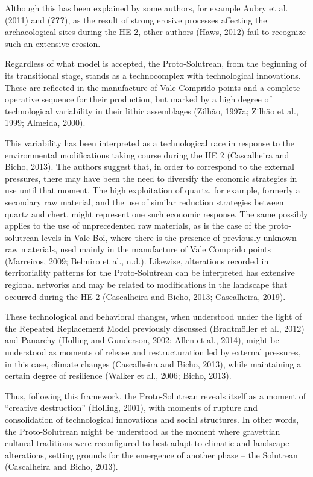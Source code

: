 \documentclass[12pt,twoside]{reedthesis}
\begin{document}
Although this has been explained by some authors, for example Aubry et al. (2011) and ({\textbf{???}}), as the result of strong erosive processes affecting the archaeological sites during the HE 2, other authors (Haws, 2012) fail to recognize such an extensive erosion.

Regardless of what model is accepted, the Proto-Solutrean, from the beginning of its transitional stage, stands as a technocomplex with technological innovations. These are reflected in the manufacture of Vale Comprido points and a complete operative sequence for their production, but marked by a high degree of technological variability in their lithic assemblages (Zilhão, 1997a; Zilhão et al., 1999; Almeida, 2000).

This variability has been interpreted as a technological race in response to the environmental modifications taking course during the HE 2 (Cascalheira and Bicho, 2013). The authors suggest that, in order to correspond to the external pressures, there may have been the need to diversify the economic strategies in use until that moment. The high exploitation of quartz, for example, formerly a secondary raw material, and the use of similar reduction strategies between quartz and chert, might represent one such economic response. The same possibly applies to the use of unprecedented raw materials, as is the case of the proto-solutrean levels in Vale Boi, where there is the presence of previously unknown raw materials, used mainly in the manufacture of Vale Comprido points (Marreiros, 2009; Belmiro et al., n.d.). Likewise, alterations recorded in territoriality patterns for the Proto-Solutrean can be interpreted has extensive regional networks and may be related to modifications in the landscape that occurred during the HE 2 (Cascalheira and Bicho, 2013; Cascalheira, 2019).

These technological and behavioral changes, when understood under the light of the Repeated Replacement Model previously discussed (Bradtmöller et al., 2012) and Panarchy (Holling and Gunderson, 2002; Allen et al., 2014), might be understood as moments of release and restructuration led by external pressures, in this case, climate changes (Cascalheira and Bicho, 2013), while maintaining a certain degree of resilience (Walker et al., 2006; Bicho, 2013).

Thus, following this framework, the Proto-Solutrean reveals itself as a moment of ``creative destruction'' (Holling, 2001), with moments of rupture and consolidation of technological innovations and social structures. In other words, the Proto-Solutrean might be understood as the moment where gravettian cultural traditions were reconfigured to best adapt to climatic and landscape alterations, setting grounds for the emergence of another phase -- the Solutrean (Cascalheira and Bicho, 2013).
\end{document}
